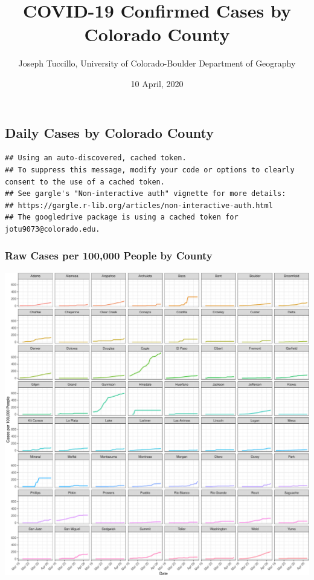\documentclass[]{article}
\title{COVID-19 Confirmed Cases by Colorado County}
\author{Joseph Tuccillo, University of Colorado-Boulder Department of Geography}
\date{10 April, 2020}
\begin{document}
\maketitle

\hypertarget{daily-cases-by-colorado-county}{%
\subsection{Daily Cases by Colorado
County}\label{daily-cases-by-colorado-county}}

\begin{verbatim}
## Using an auto-discovered, cached token.
## To suppress this message, modify your code or options to clearly consent to the use of a cached token.
## See gargle's "Non-interactive auth" vignette for more details:
## https://gargle.r-lib.org/articles/non-interactive-auth.html
## The googledrive package is using a cached token for jotu9073@colorado.edu.
\end{verbatim}

\hypertarget{raw-cases-per-100000-people-by-county}{%
\subsubsection{Raw Cases per 100,000 People by
County}\label{raw-cases-per-100000-people-by-county}}

\includegraphics{figs/daily-cases-100k-1.pdf}
\end{document}
